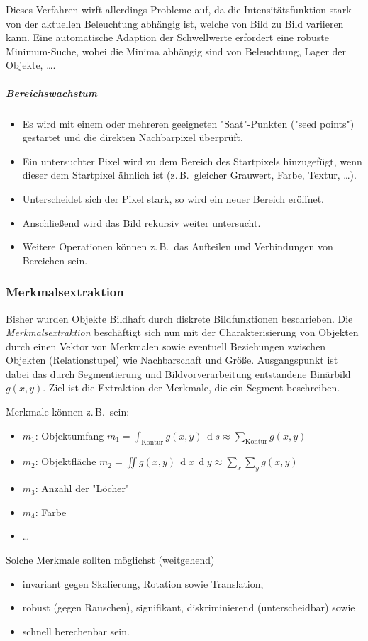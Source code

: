 \documentclass[a4paper, 11pt, accentcolor = tud3b]{tudreport}
\DeclareMathOperator{\total}{d}
\newcommand{\dif}[1]{\,\total#1}
\newcommand{\zB}{z.\,B.~}
\begin{document}
							Dieses Verfahren wirft allerdings Probleme auf, da die Intensitätsfunktion stark von der aktuellen Beleuchtung abhängig ist, welche von Bild zu Bild variieren kann. Eine automatische Adaption der Schwellwerte erfordert eine robuste Minimum-Suche, wobei die Minima abhängig sind von Beleuchtung, Lager der Objekte, \dots.

						\subparagraph{Bereichswachstum}
							\begin{itemize}
								\item Es wird mit einem oder mehreren geeigneten "Saat"-Punkten ("seed points") gestartet und die direkten Nachbarpixel überprüft.
								\item Ein untersuchter Pixel wird zu dem Bereich des Startpixels hinzugefügt, wenn dieser dem Startpixel ähnlich ist (\zB gleicher Grauwert, Farbe, Textur, \dots).
								\item Unterscheidet sich der Pixel stark, so wird ein neuer Bereich eröffnet.
								\item Anschließend wird das Bild rekursiv weiter untersucht.
								\item Weitere Operationen können \zB das Aufteilen und Verbindungen von Bereichen sein.
							\end{itemize}

				\subsubsection{Merkmalsextraktion}
					Bisher wurden Objekte Bildhaft durch diskrete Bildfunktionen beschrieben. Die \emph{Merkmalsextraktion} beschäftigt sich nun mit der Charakterisierung von Objekten durch einen Vektor von Merkmalen sowie eventuell Beziehungen zwischen Objekten (Relationstupel) wie Nachbarschaft und Größe. Ausgangspunkt ist dabei das durch Segmentierung und Bildvorverarbeitung entstandene Binärbild \( g(x, y) \). Ziel ist die Extraktion der Merkmale, die ein Segment beschreiben.
					
					Merkmale können \zB sein:
					\begin{itemize}
						\item \(m_1\): Objektumfang \( m_1 = \int_\text{Kontur} \! g(x, y) \dif{s} \approx \sum_\text{Kontur} g(x, y) \)
						\item \(m_2\): Objektfläche \( m_2 = \iint \! g(x, y) \dif{x} \dif{y} \approx \sum_x \sum_y g(x, y) \)
						\item \(m_3\): Anzahl der "Löcher"
						\item \(m_4\): Farbe
						\item \dots
					\end{itemize}
					Solche Merkmale sollten möglichst (weitgehend)
					\begin{itemize}
						\item invariant gegen Skalierung, Rotation sowie Translation,
						\item robust (gegen Rauschen), signifikant, diskriminierend (unterscheidbar) sowie
						\item schnell berechenbar sein.
					\end{itemize}
\end{document}
